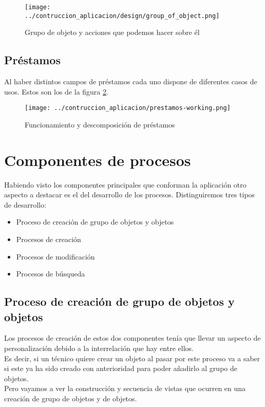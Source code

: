 \begin{figure}[h]
    \centering
    \texttt{[image: ../contruccion\_aplicacion/design/group\_of\_object.png]}
    \caption{Grupo de objeto y acciones que podemos hacer sobre él}\label{fig:group-of-object-unit}
\end{figure}


\subsection{Préstamos}
Al haber distintos campos de préstamos cada uno dispone de diferentes casos de usos. Estos son los de la figura \ref{fig:loans-diagram}.

\begin{figure}[h]
    \centering
    \texttt{[image: ../contruccion\_aplicacion/prestamos-working.png]}
    \caption{Funcionamiento y descomposición de préstamos}\label{fig:loans-diagram}
\end{figure}

\section{Componentes de procesos}
Habiendo visto los componentes principales que conforman la aplicación otro aspecto a destacar es el del desarrollo de los procesos. Distinguiremos tres tipos de desarrollo:
\begin{itemize}
    \item Proceso de creación de grupo de objetos y objetos
    \item Procesos de creación
    \item Procesos de modificación
    \item Procesos de búsqueda
\end{itemize}

\subsection{Proceso de creación de grupo de objetos y objetos}
Los procesos de creación de estos dos componentes tenía que llevar un aspecto de personalización debido a la interrelación que hay entre ellos.
\\Es decir, si un técnico quiere crear un objeto al pasar por este proceso va a saber si este ya ha sido creado con anterioridad para poder añadirlo al grupo de objetos.
\\Pero vayamos a ver la construcción y secuencia de vistas que ocurren en una creación de grupo de objetos y de objetos.
